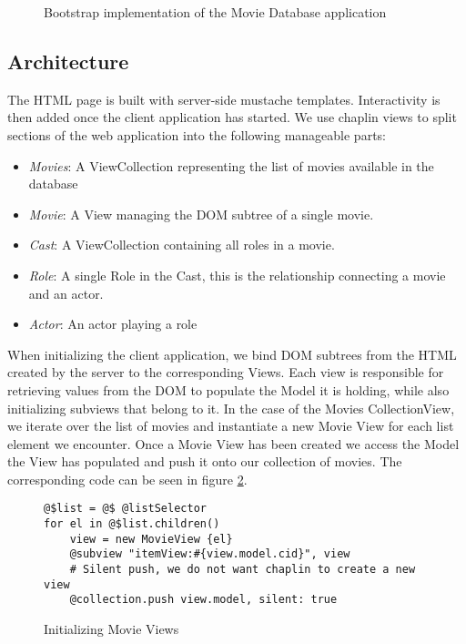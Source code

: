 \documentclass[thesis.tex]{subfiles}
\begin{document}
\begin{figure}
	\centering
	\caption{Bootstrap implementation of the Movie Database application}
	\label{fig:moviedb-bootstrap}
\end{figure}

\subsection{Architecture}
The HTML page is built with server-side mustache templates. Interactivity is
then added once the client application has started.
We use chaplin views to split sections of the web application into the following
manageable parts:

\begin{itemize}
\item \emph{Movies}: A ViewCollection representing the list of movies available
                     in the database
\item \emph{Movie}: A View managing the DOM subtree of a single movie.
\item \emph{Cast}: A ViewCollection containing all roles in a movie.
\item \emph{Role}: A single Role in the Cast, this is the relationship
                   connecting a movie and an actor.
\item \emph{Actor}: An actor playing a role
\end{itemize}

When initializing the client application, we bind DOM subtrees from the HTML
created by the server to the corresponding Views. Each view is responsible for
retrieving values from the DOM to populate the Model it is holding, while also
initializing subviews that belong to it.
In the case of the Movies CollectionView, we iterate over the list of movies and
instantiate a new Movie View for each list element we encounter.
Once a Movie View has been created we access the Model the View has populated
and push it onto our collection of movies. The corresponding code can be seen in
figure \ref{fig:movies-iter}.
\begin{figure}
	\centering
	\begin{lstlisting}
@$list = @$ @listSelector
for el in @$list.children()
	view = new MovieView {el}
	@subview "itemView:#{view.model.cid}", view
	# Silent push, we do not want chaplin to create a new view
	@collection.push view.model, silent: true
	\end{lstlisting}
	\caption{Initializing Movie Views}
	\label{fig:movies-iter}
\end{figure}
\end{document}
